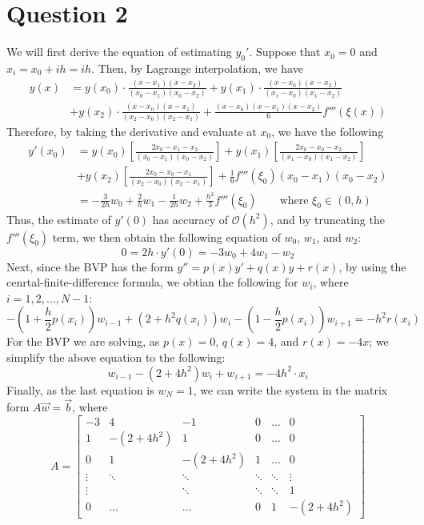 \documentclass[11pt]{article}
\begin{document}
\section*{Question 2}
We will first derive the equation of estimating $ y_0' $. Suppose that $x_0 = 0$ and $x_i = x_0 + ih = ih $. Then, by Lagrange interpolation, we have
\begin{align*}
	 y(x) &= y(x_0)\cdot\frac{(x-x_1)(x-x_2)}{(x_0 - x_1)(x_0-x_2)} + y(x_1) \cdot \frac{(x-x_0)(x-x_2)}{(x_1 - x_0)(x_1-x_2)}\\
	 &+  y(x_2) \cdot \frac{(x-x_0)(x-x_1)}{(x_2 - x_0)(x_2-x_1)} + \frac{(x-x_0)(x-x_1)(x-x_2)}{6}f'''(\xi(x))
\end{align*}
Therefore, by taking the derivative and evaluate at $x_0$, we have the following
\begin{align*}
	y'(x_0) &= y(x_0)\left[ \frac{2x_0 - x_1 - x_2}{(x_0 - x_1)(x_0-x_2)} \right] + y(x_1) \left[ \frac{2x_0 - x_0 - x_2}{(x_1 - x_0)(x_1-x_2)} \right] \\
	&+ y(x_2)\left[ \frac{2x_0 - x_0 - x_1}{(x_2 - x_0)(x_2-x_1)} \right] + \frac{1}{6}f'''(\xi_0) (x_0-x_1)(x_0-x_2)\\
	&= - \frac{3}{2h}w_0 + \frac{2}{h}w_1 - \frac{1}{2h}w_2 + \frac{h^2}{3}f'''(\xi_0) \qquad \text{where $\xi_0 \in (0,h)$}
\end{align*}
Thus, the estimate of $ y'(0) $ has accuracy of $\mathcal{O}(h^2)$, and by truncating the $f'''(\xi_0)$ term, we then obtain the following equation of $w_0$, $w_1$, and $w_2$:
\[ 0 = 2h \cdot y'(0) = -3w_0 + 4w_1 - w_2 \]
 Next, since the BVP has the form $y'' = p(x)y' + q(x)y + r(x) $, by using the cenrtal-finite-difference formula, we obtian the following for $ w_i $, where $ i = 1, 2, ..., N-1 $:
 \[ -\left(1+\frac{h}{2}p(x_i)\right)w_{i-1} + (2+h^2q(x_i))w_i -\left(1-\frac{h}{2}p(x_i)\right)w_{i+1} = -h^2r(x_i) \]
 For the BVP we are solving, as $p(x) = 0$, $q(x) = 4$, and $r(x) = -4x$; we simplify the above equation to the following:
 \[ w_{i-1} - (2+4h^2)w_i + w_{i+1} = -4h^2\cdot x_i \]
Finally, as the last equation is $w_N = 1$, we can write the system in the matrix form $A\vec{w} = \vec{b}$, where
 \[A = \begin{bmatrix}
 	-3 & 4  & -1 & 0 &  \dots & 0\\
	1 & -(2+4h^2) & 1 & 0 & \dots & 0 \\
	0 & 1 & -(2+4h^2) & 1 & \dots & 0 \\
	\vdots & \ddots &  \ddots & \ddots & \ddots & \vdots \\
	\vdots &  & \ddots & \ddots & \ddots & 1 \\
	0 & \dots & \dots & 0 & 1 & -(2+4h^2)
\end{bmatrix} \]
\end{document}
